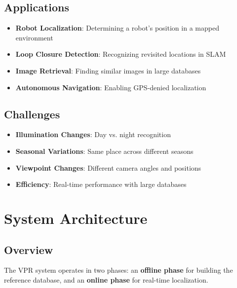 \documentclass[11pt,a4paper]{article}
\begin{document}
\subsection{Applications}

\begin{itemize}
    \item \textbf{Robot Localization}: Determining a robot's position in a mapped environment
    \item \textbf{Loop Closure Detection}: Recognizing revisited locations in SLAM
    \item \textbf{Image Retrieval}: Finding similar images in large databases
    \item \textbf{Autonomous Navigation}: Enabling GPS-denied localization
\end{itemize}

\subsection{Challenges}

\begin{itemize}
    \item \textbf{Illumination Changes}: Day vs. night recognition
    \item \textbf{Seasonal Variations}: Same place across different seasons
    \item \textbf{Viewpoint Changes}: Different camera angles and positions
    \item \textbf{Efficiency}: Real-time performance with large databases
\end{itemize}

\newpage
\section{System Architecture}

\subsection{Overview}

The VPR system operates in two phases: an \textbf{offline phase} for building the reference database, and an \textbf{online phase} for real-time localization.
\end{document}
